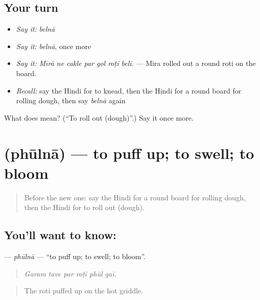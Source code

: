\subsection*{Your turn}
\begin{itemize}
\raggedright
  \item \emph{Say it:} \emph{belnā}
  \item \emph{Say it:} \emph{belnā}, once more
  \item \emph{Say it:} \emph{Mīrā ne cakle par gol roṭī belī.} — Mira rolled out a round roti on the board.
  \item \emph{Recall:} say the Hindi for to knead, then the Hindi for a round board for rolling dough, then say \emph{belnā} again
\end{itemize}

\begin{tcolorbox}[breakable,colback=teal!4,colframe=teal!35!black,title={Before you move on}]
What does  mean? (\textquotedblleft{}To roll out (dough)\textquotedblright{}.) Say it once more.
\end{tcolorbox}
\section[\texorpdfstring{\hi{फूलना} (phūlnā)}{फूलना (phūlnā)}]{ (phūlnā) — to puff up; to swell; to bloom}

\label{lesson:HI-C520-phulna}



\begin{quote}
Before the new one: say the Hindi for a round board for rolling dough, then the Hindi for to roll out (dough).
\end{quote}

\subsection*{You'll want to know: }
\textbf{} — \emph{phūlnā} — \textquotedblleft{}to puff up; to swell; to bloom\textquotedblright{}.

\begin{quote}
     
\end{quote}

\begin{quote}
\emph{Garam tave par roṭī phūl gaī.}
\end{quote}

\begin{quote}
The roti puffed up on the hot griddle.
\end{quote}

